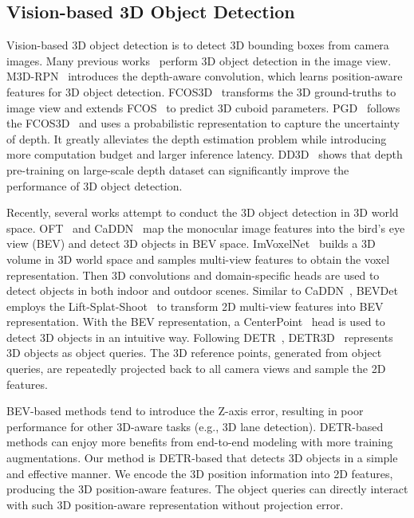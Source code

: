 \documentclass[runningheads]{llncs}
\begin{document}
\subsection{Vision-based 3D Object Detection}
Vision-based 3D object detection is to detect 3D bounding boxes from camera images. 
Many previous works~\cite{chen2016monocular,mousavian20173d,kehl2017ssd,ku2019monocular,simonelli2019disentangling,jorgensen2019monocular,brazil2019m3d,wang2021fcos3d,wang2022pgd} perform 3D object detection in the image view. 
M3D-RPN~\cite{brazil2019m3d} introduces the depth-aware convolution, which learns position-aware features for 3D object detection.
FCOS3D~\cite{wang2021fcos3d} transforms the 3D ground-truths to image view and extends FCOS~\cite{tian2019fcos} to predict 3D cuboid parameters. PGD~\cite{wang2022pgd} follows the FCOS3D~\cite{wang2021fcos3d} and uses a probabilistic representation to capture the uncertainty of depth. It greatly alleviates the depth estimation problem while introducing more computation budget and larger inference latency. DD3D~\cite{park2021dd3d} shows that depth pre-training on large-scale depth dataset can significantly improve the performance of 3D object detection. 



Recently, several works attempt to conduct the 3D object detection in 3D world space. 
OFT~\cite{roddick2018orthographic} and CaDDN~\cite{reading2021categorical} map the monocular image features into the bird’s eye view (BEV) and detect 3D objects in BEV space. ImVoxelNet~\cite{rukhovich2022imvoxelnet} builds a 3D volume in 3D world space and samples multi-view features to obtain the voxel representation. Then 3D convolutions and domain-specific heads are used to detect objects in both indoor and outdoor scenes. Similar to CaDDN~\cite{reading2021categorical}, BEVDet~\cite{huang2021bevdet} employs the Lift-Splat-Shoot~\cite{philion2020lift} to transform 2D multi-view features into BEV representation. With the BEV representation, a CenterPoint~\cite{yin2021center} head is used to detect 3D objects in an intuitive way.
Following DETR~\cite{carion2020detr}, DETR3D~\cite{wang2022detr3d} represents 3D objects as object queries. The 3D reference points, generated from object queries, are repeatedly projected back to all camera views and sample the 2D features.

BEV-based methods tend to introduce the Z-axis error, resulting in poor performance for other 3D-aware tasks (e.g., 3D lane detection). DETR-based methods can enjoy more benefits from end-to-end modeling with more training augmentations. Our  method is DETR-based that detects 3D objects in a simple and effective manner. We encode the 3D position information into 2D features, producing the 3D position-aware features. The object queries can directly interact with such 3D position-aware representation without projection error. 
\end{document}
